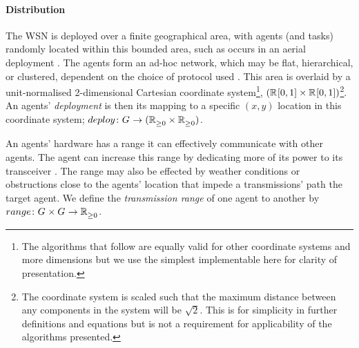 \paragraph{Distribution}
\label{section:task_and_resources:distribution}
\newcommand{\formalDeployment}[2]{\functionFormal{deploy}{\setAgents{}{}}{(\setRealNumbersNonNegative{}{} \times \setRealNumbersNonNegative{}{})}}

\newcommand{\functionDeployment}[2]{
	\functionSignature{deploy}{\varAgent{#1}{#2}}
}

\newcommand{\formalTransmissionRange}[2]{
	\functionFormal{range}
	{\setAgents{}{} \times \setAgents{}{}}
	{\setRealNumbersNonNegative{}{}}
}
\newcommand{\functionTransmissionRange}[2]{\functionSignature{range}{\varAgent{#1}{}, varAgent{#2}{}}}

The WSN is deployed over a finite geographical area, with agents (and tasks) randomly located within this bounded area, such as occurs in an aerial deployment \citep{Kumar2013}.  The agents form an ad-hoc network, which may be flat, hierarchical, or clustered, dependent on the choice of protocol used \citep{Carlos-Mancilla2016b}. This area is overlaid by a unit-normalised 2-dimensional Cartesian coordinate system\footnote{The algorithms that follow are equally valid for other coordinate systems and more dimensions but we use the simplest implementable here for clarity of presentation.},  $(\mathbb{R}_{}^{}[0,1] \times \mathbb{R}_{}^{}[0,1])$\footnote{The coordinate system is scaled such that the maximum distance between any components in the system will be $\sqrt{2}$. This is for simplicity in further definitions and equations but is not a requirement for applicability of the algorithms presented.}. An agents' \textit{deployment} is then its mapping to a specific $(x, y)$ location in this coordinate system; $\formalDeployment{}{}$.

An agents' hardware has a range it can effectively communicate with other agents. The agent can increase this range by dedicating more of its power to its transceiver \citep{Padmanabh2008, Song2009, Radman2010}. The range may also be effected by weather conditions or obstructions close to the agents' location that impede a transmissions' path the target agent. We define the \textit{transmission range} of one agent to another by $\formalTransmissionRange{}{}$.  

